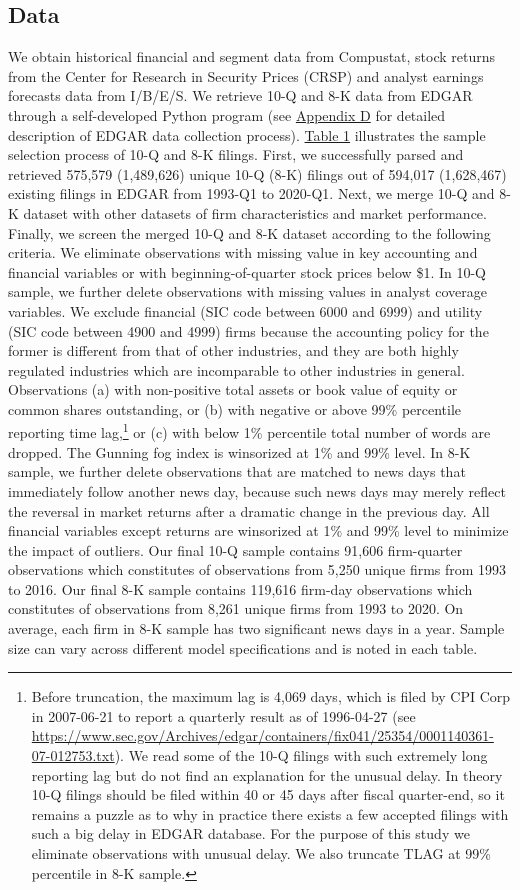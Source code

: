 \documentclass[letterpaper,11pt]{article}
\begin{document}
\begin{spacing}{1.5}
\subsection{Data}
We obtain historical financial and segment data from Compustat, stock returns from the Center for Research in Security Prices (CRSP) and analyst earnings forecasts data from I/B/E/S. We retrieve 10-Q and 8-K data from EDGAR through a self-developed Python program (see \hyperref[appd]{Appendix D} for detailed description of EDGAR data collection process). \hyperref[T1]{Table 1} illustrates the sample selection process of 10-Q and 8-K filings. First, we successfully parsed and retrieved 575,579 (1,489,626) unique 10-Q (8-K) filings out of 594,017 (1,628,467) existing filings in EDGAR from 1993-Q1 to 2020-Q1. Next, we merge 10-Q and 8-K dataset with other datasets of firm characteristics and market performance. Finally, we screen the merged 10-Q and 8-K dataset according to the following criteria. We eliminate observations with missing value in key accounting and financial variables or with beginning-of-quarter stock prices below \$1. In 10-Q sample, we further delete observations with missing values in analyst coverage variables. We exclude financial (SIC code between 6000 and 6999) and utility (SIC code between 4900 and 4999) firms because the accounting policy for the former is different from that of other industries, and they are both highly regulated industries which are incomparable to other industries in general. Observations (a) with non-positive total assets or book value of equity or common shares outstanding, or (b) with negative or above 99\% percentile reporting time lag,\footnote{Before truncation, the maximum lag is 4,069 days, which is filed by CPI Corp in 2007-06-21 to report a quarterly result as of 1996-04-27 (see \url{https://www.sec.gov/Archives/edgar/containers/fix041/25354/0001140361-07-012753.txt}). We read some of the 10-Q filings with such extremely long reporting lag but do not find an explanation for the unusual delay. In theory 10-Q filings should be filed within 40 or 45 days after fiscal quarter-end, so it remains a puzzle as to why in practice there exists a few accepted filings with such a big delay in EDGAR database. For the purpose of this study we eliminate observations with unusual delay. We also truncate TLAG at 99\% percentile in 8-K sample.} or (c) with below 1\% percentile total number of words are dropped. The Gunning fog index is winsorized at 1\% and 99\% level. In 8-K sample, we further delete observations that are matched to news days that immediately follow another news day, because such news days may merely reflect the reversal in market returns after a dramatic change in the previous day. All financial variables except returns are winsorized at 1\% and 99\% level to minimize the impact of outliers. Our final 10-Q sample contains 91,606 firm-quarter observations which constitutes of observations from 5,250 unique firms from 1993 to 2016. Our final 8-K sample contains 119,616 firm-day observations which constitutes of observations from 8,261 unique firms from 1993 to 2020. On average, each firm in 8-K sample has two significant news days in a year. Sample size can vary across different model specifications and is noted in each table. 


\end{spacing}
\end{document}
